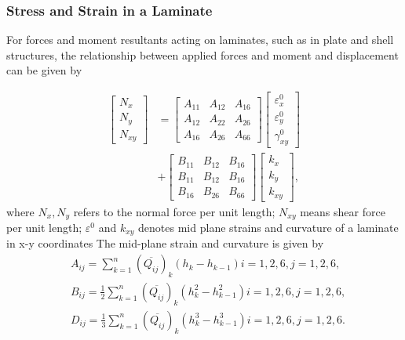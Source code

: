 \subsubsection{Stress and Strain in a Laminate}
For forces and moment resultants acting on laminates, such as in plate and shell
structures, the relationship between applied forces and moment and displacement
can be given by

\begin{equation} \label{eq:force_and_moments}
	\begin{array}{ll}
	\begin{bmatrix}
		N_x \\
		N_y \\
		N_{xy}
	\end{bmatrix}
	&=
	\begin{bmatrix}
		A_{11} & A_{12} & A_{16} \\
		A_{12} & A_{22} & A_{26} \\
		A_{16} & A_{26} & A_{66} 
	\end{bmatrix}
    \begin{bmatrix}
		\varepsilon_x^0 \\
        \varepsilon_y^0 \\
		\gamma_{xy}^0
    \end{bmatrix}   \\
	&+               
	\begin{bmatrix}
		B_{11} & B_{12} & B_{16} \\
		B_{11} & B_{12} & B_{16} \\
		B_{16} & B_{26} & B_{66} 
	\end{bmatrix}
	\begin{bmatrix}
		k_x \\
		k_y \\
		k_{xy} 
	\end{bmatrix}  \textstyle{,}
	\end{array}
\end{equation}
where $N_x,N_y $ refers to the normal force per unit length;
$N_{xy}$ means shear force per unit length;
$\varepsilon^{0}$ and $k_{xy}$ denotes  mid plane strains and curvature of a laminate in x-y coordinates
The mid-plane strain and curvature is given by
\begin{equation}
    \begin{split}
	&A_{ij}=\sum_{k=1}^{n}(\overline{Q_{ij}})_k(h_k-h_{k-1})  i=1,2,6, j=1,2,6 \textstyle{,}\\
    &B_{ij}=\frac{1}{2}\sum_{k=1}^{n}(\overline{Q_{ij}})_k(h_k^2 - h_{k-1}^2)  i=1,2,6, j=1,2,6\textstyle{,}\\
    &D_{ij}=\frac{1}{3}\sum_{k=1}^{n}(\overline{Q_{ij}})_k(h_k^3 - h_{k-1}^3) i=1,2,6, j=1,2,6\textstyle{.}\\
    \end{split}
\end{equation}

